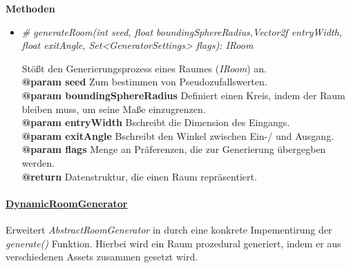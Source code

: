             \textbf{Methoden}					
            \begin{itemize}
                \item  \textit{\# generateRoom(int seed, float boundingSphereRadius,Vector2f entryWidth, float exitAngle, Set<GeneratorSettings> flags): IRoom}
                    \begin{leftbar}[0.9\linewidth]
                        Stößt den Generierungsprozess eines Raumes (\textit{IRoom}) an.\\
                        \textbf{@param seed} Zum bestimmen von Pseudozufallswerten.\\
                        \textbf{@param boundingSphereRadius} Definiert einen Kreis, indem der Raum bleiben muss, um seine Maße einzugrenzen.\\
                        \textbf{@param entryWidth} Bschreibt die Dimension des Eingangs.\\
                        \textbf{@param exitAngle} Bschreibt den Winkel zwischen Ein-/ und Ausgang.\\
                        \textbf{@param flags} Menge an Präferenzen, die zur Generierung übergegben werden.\\
                        \textbf{@return} Datenstruktur, die einen Raum repräsentiert.
                    \end{leftbar}   
            \end{itemize}
        
        
        
        \paragraph{\underline{DynamicRoomGenerator}} \mbox{}\par
            Erweitert \textit{AbstractRoomGenerator} in durch eine konkrete Impementirung der \textit{generate()} Funktion.
            Hierbei wird ein Raum prozedural generiert, indem er aus verschiedenen Assets zusammen gesetzt wird.\par
            
